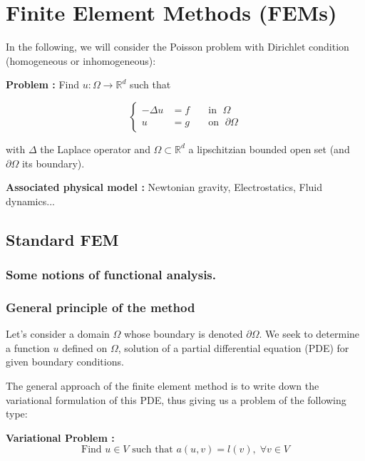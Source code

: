 \section{Finite Element Methods (FEMs)}
\graphicspath{{images/FEM}}

In the following, we will consider the Poisson problem with Dirichlet condition (homogeneous or inhomogeneous):

\textbf{Problem :} Find $u : \Omega \rightarrow \mathbb{R}^d$ such that

\begin{equation*}
	\left\{
		\begin{aligned}
			-\Delta u &= f \; &&\text{in } \; \Omega \\
			u&=g \; &&\text{on } \; \partial\Omega
		\end{aligned}
	\right.
\end{equation*}

with $\Delta$ the Laplace operator and $\Omega\subset\mathbb{R}^d$ a lipschitzian bounded open set (and $\partial\Omega$ its boundary).

\textbf{Associated physical model :} Newtonian gravity, Electrostatics, Fluid dynamics...

\subsection{Standard FEM}

\subsubsection{Some notions of functional analysis.}


\subsubsection{General principle of the method}

Let's consider a domain $\Omega$ whose boundary is denoted $\partial\Omega$. We seek to determine a function $u$ defined on $\Omega$, solution of a partial differential equation (PDE) for given boundary conditions.

The general approach of the finite element method is to write down the variational formulation of this PDE, thus giving us a problem of the following type:

\textbf{Variational Problem :}
\begin{equation*}
	\text{Find } u\in V \text{ such that } a(u,v)=l(v), \;\forall v\in V
\end{equation*}

